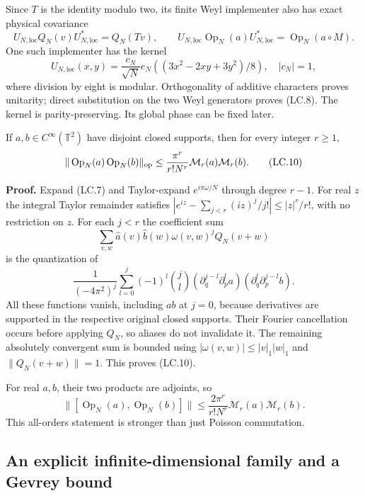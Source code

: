 Since \(T\) is the identity modulo two, its finite Weyl implementer also has exact physical covariance \[
 U_{N,\mathrm{loc}}Q_N(v)U_{N,\mathrm{loc}}^*=Q_N(Tv),\qquad
 U_{N,\mathrm{loc}}\operatorname{Op}_N(a)U_{N,\mathrm{loc}}^*=\operatorname{Op}_N(a\circ M). \tag{LC.8}
\] One such implementer has the kernel \[
 U_{N,\mathrm{loc}}(x,y)=\frac{c_N}{\sqrt N}
 e_N\!\left((3x^2-2xy+3y^2)/8\right),\quad |c_N|=1,         \tag{LC.9}
\] where division by eight is modular. Orthogonality of additive characters proves unitarity; direct substitution on the two Weyl generators proves (LC.8). The kernel is parity-preserving. Its global phase can be fixed later.

\begin{lemma}\label{pass1:ch09_locality_fixed_strength-4} If \(a,b\in C^\infty(\mathbb T^2)\) have disjoint closed supports, then for every integer \(r\geq1\), \[
 \|\operatorname{Op}_N(a)\operatorname{Op}_N(b)\|_{\rm op}
 \leq\frac{\pi^r}{r!N^r}\mathcal M_r(a)\mathcal M_r(b).       \tag{LC.10}
\]
\end{lemma}

\textbf{Proof.} Expand (LC.7) and Taylor-expand \(e^{i\pi\omega/N}\) through degree \(r-1\). For real \(z\) the integral Taylor remainder satisfies \(|e^{iz}-\sum_{j<r}(iz)^j/j!|\leq|z|^r/r!\), with no restriction on \(z\). For each \(j<r\) the coefficient sum \[
 \sum_{v,w}\widehat a(v)\widehat b(w)\omega(v,w)^j Q_N(v+w)
\] is the quantization of \[
 \frac{1}{(-4\pi^2)^j}\sum_{l=0}^j(-1)^l\binom jl
 (\partial_q^{j-l}\partial_p^l a)
 (\partial_q^l\partial_p^{j-l} b).                           \tag{LC.11}
\] All these functions vanish, including \(ab\) at \(j=0\), because derivatives are supported in the respective original closed supports. Their Fourier cancellation occurs before applying \(Q_N\), so aliases do not invalidate it. The remaining absolutely convergent sum is bounded using \(|\omega(v,w)|\leq|v|_1|w|_1\) and \(\|Q_N(v+w)\|=1\). This proves (LC.10).

For real \(a,b\), their two products are adjoints, so \[
 \|[\operatorname{Op}_N(a),\operatorname{Op}_N(b)]\|
 \leq\frac{2\pi^r}{r!N^r}\mathcal M_r(a)\mathcal M_r(b).      \tag{LC.12}
\] This all-orders statement is stronger than just Poisson commutation.

\subsection{An explicit infinite-dimensional family and a Gevrey bound}\label{locality:an-explicit-infinite-dimensional-family-and-a-gevrey-bound}

